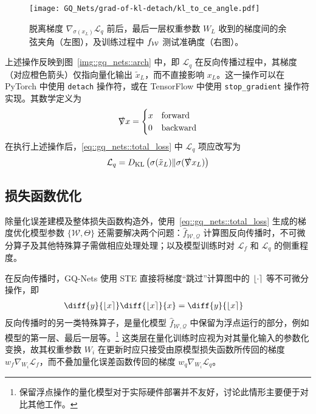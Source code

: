 \begin{figure}[htb]
  \centering
  \texttt{[image: GQ\_Nets/grad-of-kl-detach/kl\_to\_ce\_angle.pdf]}
  \caption{脱离梯度 $\nabla_{\sigma(x_L)}\mathcal{L}_q$ 前后，最后一层权重参数 $W_L$ 收到的梯度间的余弦夹角（左图），及训练过程中 $f_{\mathcal{W}}$ 测试准确度（右图）。}
  \label{img::gq_nets::detach_grad_cos}
\end{figure}

上述操作反映到图~\ref{img::gq_nets::arch} 中，即 $\mathcal{L}_q$ 在反向传播过程中，其梯度（对应橙色箭头）仅指向量化输出 $\tilde{x}_L$，而不直接影响 $x_L$。这一操作可以在 PyTorch 中使用 \verb|detach| 操作符，或在 TensorFlow 中使用 \verb|stop_gradient| 操作符实现。其数学定义为
\begin{align}
  \slashed{\nabla} x =
    \begin{cases}
      x & \text{forward} \\
      0 & \text{backward}
    \end{cases}
\end{align}
在执行上述操作后，\eqref{eq::gq_nets::total_loss} 中 $\mathcal{L}_q$ 项应改写为
\begin{align}
  \mathcal{L}_q = D_{\mathrm{KL}}\left( \sigma(\tilde{x}_L) \| \sigma(\slashed{\nabla} x_L) \right)
\end{align}
\subsection{损失函数优化} \label{sec::gq_nets::optimize_loss_func}
除量化误差建模及整体损失函数构造外，使用~\eqref{eq::gq_nets::total_loss} 生成的梯度优化模型参数 $\{\mathcal{W}, \Theta\}$ 还需要解决两个问题：$\hat{f}_{\mathcal{W, Q}}$ 计算图反向传播时，不可微分算子及其他特殊算子需做相应处理处理；以及模型训练时对 $\mathcal{L}_f$ 和 $\mathcal{L}_q$ 的侧重程度。

在反向传播时，GQ-Nets 使用 STE 直接将梯度“跳过”计算图中的 $\left\lfloor \cdot \right\rceil$ 等不可微分操作，即
\begin{align}
  \diff{y}{\Round{x}} \diff{\Round{x}}{x} &= \diff{y}{\Round{x}}
\end{align}
反向传播时的另一类特殊算子，是量化模型 $\hat{f}_{\mathcal{W, Q}}$ 中保留为浮点运行的部分，例如模型的第一层、最后一层等。\footnote{保留浮点操作的量化模型对于实际硬件部署并不友好，讨论此情形主要便于对比其他工作。} 这类层在量化训练时应视为对其量化输入的参数化变换，故其权重参数 $W_i$ 在更新时应只接受由原模型损失函数所传回的梯度 $w_f \nabla_{W_i}\mathcal{L}_f$，而不叠加量化误差函数传回的梯度 $w_q \nabla_{W_i}\mathcal{L}_q$。

